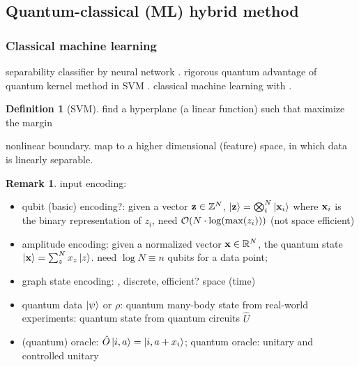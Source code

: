 \documentclass[
10pt,
aps,
pra,
linenumbers,
floatfix,
]{revtex4-2}
\theoremstyle{plain}
\theoremstyle{definition}
\newtheorem{definition}{Definition}
\newtheorem{remark}{Remark}
\newcommand{\U}{\hat{U}}
\newcommand{\dm}{\rho}
\newcommand{\oracle}{\hat{O}}
\begin{document}
\subsection{Quantum-classical (ML) hybrid method}
\subsubsection{Classical machine learning}\label{sec:classical_machine_learning}
separability classifier by neural network \cite{luSeparabilityEntanglementClassifierMachine2018}.
rigorous quantum advantage of quantum kernel method in SVM \cite{liuRigorousRobustQuantum2021}.
classical machine learning with  \cite{huangProvablyEfficientMachine2021}.
\begin{definition}[SVM]\label{def:svm}
	find a hyperplane (a linear function) such that maximize the margin
\end{definition}
nonlinear boundary. map to a higher dimensional (feature) space, in which data is linearly separable.
\begin{remark}
	input encoding: 
	\begin{itemize}
		\item qubit (basic) encoding?: given a vector $\vb{z}\in\mathbb{Z}^N$, 
		$\ket{\vb{z}}=\bigotimes_i^N \ket{\vb{x}_i}$ where $\vb{x}_i$ is the binary representation of $z_i$,
		need $\mathcal{O}(N\cdot \log(\max(z_i)))$ (not space efficient)

		\item amplitude encoding: given a normalized vector $\vb{x}\in\mathbb{R}^N$, the quantum state $\ket{\vb{x}}=\sum_z^N x_z\ket{z}$. 
		need $\log N \equiv n$ qubits for a data point;

		\item graph state encoding: , discrete, efficient? space (time)

		\item quantum data $\ket{\psi}$ or $\dm$: quantum many-body state from real-world experiments: quantum state from quantum circuits $\U$

		\item (quantum) oracle: $\oracle \ket{i,a}=\ket{i,a+x_i}$; quantum oracle: unitary and controlled unitary
	\end{itemize}
\end{remark}
\end{document}

